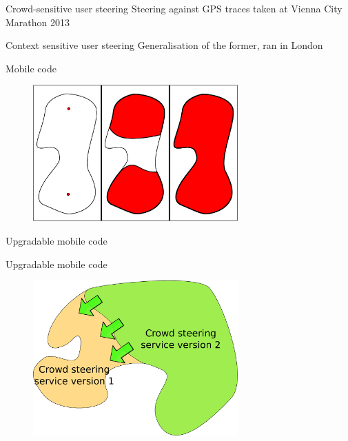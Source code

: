 \documentclass[presentation]{beamer}\mode<presentation>{\usetheme{sapere}}
\begin{document}
\begin{frame}{Crowd-sensitive user steering}
{\footnotesize Steering against GPS traces taken at Vienna City Marathon 2013}
\begin{center}
\end{center}
\end{frame}

\begin{frame}{Context sensitive user steering}
{\footnotesize Generalisation of the former, ran in London}
\begin{center}
\end{center}
\end{frame}

\begin{frame}{Mobile code}
  \centering
  \begin{figure}
    \includegraphics[width=0.7\textwidth]{imgs/inject} 
  \end{figure}
\end{frame}

\begin{frame}[fragile]{Upgradable mobile code}
\begin{center}
\end{center}
\end{frame}

\begin{frame}{Upgradable mobile code}
  \centering
  \begin{figure}
    \includegraphics[width=0.7\textwidth]{imgs/upgrade} 
  \end{figure}
\end{frame}
\end{document}
